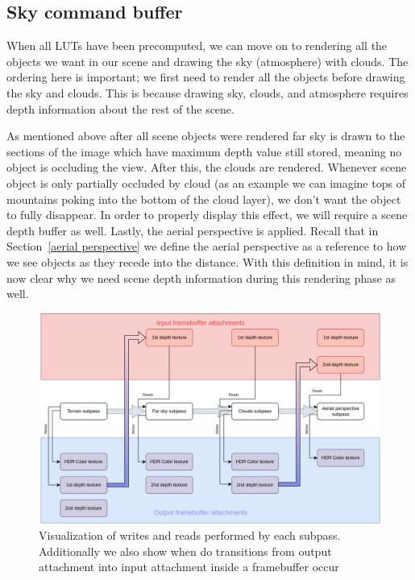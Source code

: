 \documentclass{ctuthesis}
\begin{document}
\subsection{Sky command buffer}
\label{Sky command buffer}
When all LUTs have been precomputed, we can move on to rendering all the objects we want
in our scene and drawing the sky (atmosphere) with clouds. The ordering here is important; we
first need to render all the objects before drawing the sky and clouds. This is because drawing 
sky, clouds, and atmosphere requires depth information about the rest of the scene.

As mentioned above after all scene objects were rendered far sky is drawn to the sections
of the image which have maximum depth value still stored, meaning no object is occluding the view.
After this, the clouds are rendered.
Whenever scene object is only partially occluded by cloud (as an example we can imagine tops of mountains poking into
the bottom of the cloud layer), we don't want the object to fully disappear. In order to properly
display this effect, we will require a scene depth buffer as well. Lastly, the aerial perspective is applied.
Recall that in Section~\ref{aerial perspective} we define the aerial perspective as a reference
to how we see objects as they recede into the distance. With this definition in mind, it is now clear why we need scene
depth information during this rendering phase as well.

\begin{figure}
    \centering
    \includegraphics[width=1.0\textwidth]{media/Sky_render_read_write_dependencies.png}
    \caption[Supass reads and writes]{Visualization of writes and reads performed by each subpass. Additionally we also show
    when do transitions from output attachment into input attachment inside a framebuffer occur }
    \label{fig:Sky render read write deps}
\end{figure}
\end{document}

